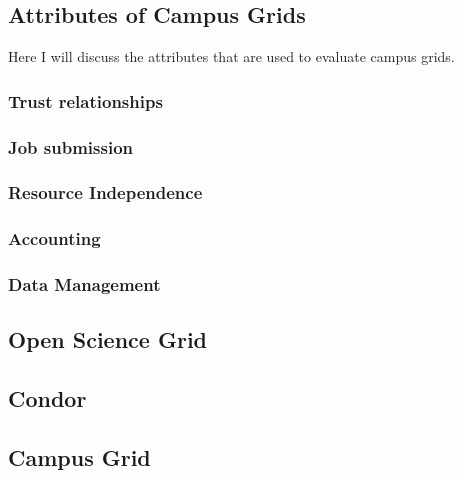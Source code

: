 \documentclass[11pt]{article}
\begin{document}
\subsection{Attributes of Campus Grids}
Here I will discuss the attributes that are used to evaluate campus grids.

\subsubsection{Trust relationships}

\subsubsection{Job submission}

\subsubsection{Resource Independence}

\subsubsection{Accounting}

\subsubsection{Data Management}


\subsection{Open Science Grid}

\subsection{Condor}

\subsection{Campus Grid}




\end{document}
